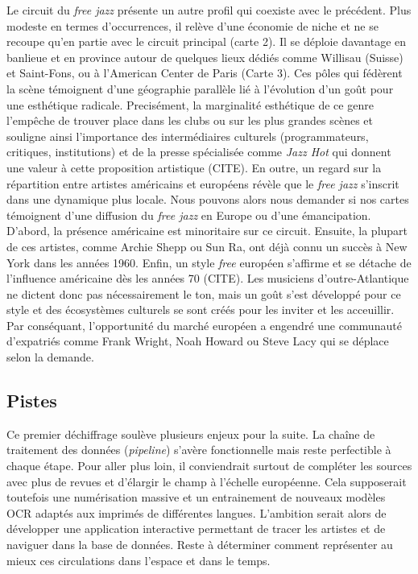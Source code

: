 \documentclass[11pt,french,hyphens]{article}
\begin{document}
Le circuit du \textit{free jazz} présente un autre profil qui coexiste avec le précédent. Plus modeste en termes d'occurrences, il relève d'une économie de niche et ne se recoupe qu'en partie avec le circuit principal (carte 2). Il se déploie davantage en banlieue et en province autour de quelques lieux dédiés comme Willisau (Suisse) et Saint-Fons, ou à l'American Center de Paris (Carte 3). Ces pôles qui fédèrent la scène témoignent d'une géographie parallèle lié à l'évolution d'un goût pour une esthétique radicale. Precisément, la marginalité esthétique de ce genre l'empêche de trouver place dans les clubs ou sur les plus grandes scènes et souligne ainsi l'importance des intermédiaires culturels (programmateurs, critiques, institutions) et de la presse spécialisée comme \textit{Jazz Hot} qui donnent une valeur à cette proposition artistique (CITE). En outre, un regard sur la répartition entre artistes américains et européens révèle que le \textit{free jazz} s'inscrit dans une dynamique plus locale. Nous pouvons alors nous demander si nos cartes témoignent d'une diffusion du \textit{free jazz} en Europe ou d'une émancipation. D'abord, la présence américaine est minoritaire sur ce circuit. Ensuite, la plupart de ces artistes, comme Archie Shepp ou Sun Ra, ont déjà connu un succès à New York dans les années 1960. Enfin, un style \textit{free} européen s'affirme et se détache de l'influence américaine dès les années 70 (CITE). Les musiciens d'outre-Atlantique ne dictent donc pas nécessairement le ton, mais un goût s'est développé pour ce style et des écosystèmes culturels se sont créés pour les inviter et les acceuillir. Par conséquant, l'opportunité du marché européen a engendré une communauté d'expatriés comme Frank Wright, Noah Howard ou Steve Lacy qui se déplace selon la demande.

\subsection{Pistes}
Ce premier déchiffrage soulève plusieurs enjeux pour la suite. La chaîne de traitement des données (\textit{pipeline}) s'avère fonctionnelle mais reste perfectible à chaque étape. Pour aller plus loin, il conviendrait surtout de compléter les sources avec plus de revues et d'élargir le champ à l'échelle européenne. Cela supposerait toutefois une numérisation massive et un entrainement de nouveaux modèles OCR adaptés aux imprimés de différentes langues. L'ambition serait alors de développer une application interactive permettant de tracer les artistes et de naviguer dans la base de données. Reste à déterminer comment représenter au mieux ces circulations dans l'espace et dans le temps.


\printbibliography
\end{document}
